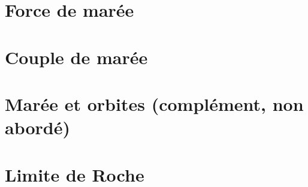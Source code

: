 \documentclass[a4paper,DIV16,10pt]{scrartcl}
\begin{document}
 \inidoc



\newpage
\section{Force de marée}


\newpage
\section{Couple de marée}


\newpage
\section{Marée et orbites (complément, non abordé)}


%

\newpage
\section{Limite de Roche}


%

%

%
\end{document}
